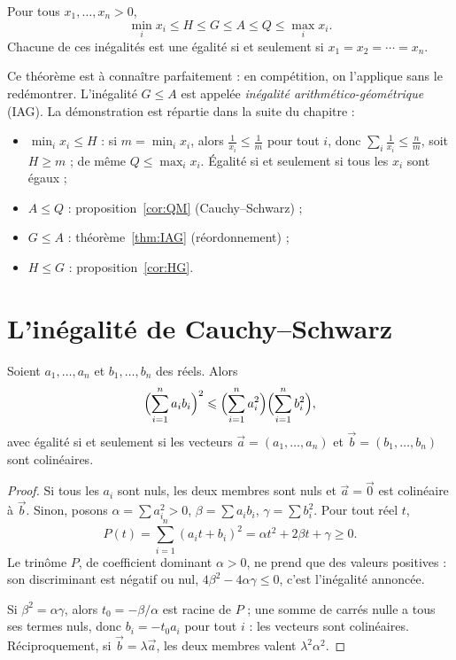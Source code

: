 \documentclass[11pt]{article}
\begin{document}
\begin{theoreme}\label{thm:moyn}
Pour tous $x_1, \ldots, x_n > 0$,
\[
\min_i x_i \leqslant H \leqslant G \leqslant A \leqslant Q \leqslant \max_i x_i .
\]
Chacune de ces inégalités est une égalité si et seulement si
$x_1 = x_2 = \cdots = x_n$.
\end{theoreme}

Ce théorème est à connaître parfaitement : en compétition, on l'applique
sans le redémontrer. L'inégalité $G \leqslant A$ est appelée
\emph{inégalité arithmético-géométrique} (IAG). La démonstration est
répartie dans la suite du chapitre :
\begin{itemize}
  \item $\min_i x_i \leqslant H$ : si $m = \min_i x_i$, alors
  $\frac{1}{x_i} \leqslant \frac1m$ pour tout $i$, donc
  $\sum_i \frac1{x_i} \leqslant \frac nm$, soit $H \geqslant m$ ; de même
  $Q \leqslant \max_i x_i$. Égalité si et seulement si tous les $x_i$ sont égaux ;
  \item $A \leqslant Q$ : proposition~\ref{cor:QM} (Cauchy--Schwarz) ;
  \item $G \leqslant A$ : théorème~\ref{thm:IAG} (réordonnement) ;
  \item $H \leqslant G$ : proposition~\ref{cor:HG}.
\end{itemize}

\section{L'inégalité de Cauchy--Schwarz}\label{sec:cauchy-schwarz}

\begin{theoreme}\label{thm:CS}
Soient $a_1, \ldots, a_n$ et $b_1, \ldots, b_n$ des réels. Alors
\[
\Bigl(\sum_{i=1}^{n} a_i b_i\Bigr)^2 \leqslant \Bigl(\sum_{i=1}^{n} a_i^2\Bigr)\Bigl(\sum_{i=1}^{n} b_i^2\Bigr),
\]
avec égalité si et seulement si les vecteurs $\vec a = (a_1, \ldots, a_n)$
et $\vec b = (b_1, \ldots, b_n)$ sont colinéaires.
\end{theoreme}

\begin{proof}
Si tous les $a_i$ sont nuls, les deux membres sont nuls et $\vec a = \vec 0$
est colinéaire à $\vec b$. Sinon, posons $\alpha = \sum a_i^2 > 0$,
$\beta = \sum a_i b_i$, $\gamma = \sum b_i^2$. Pour tout réel $t$,
\[
P(t) = \sum_{i=1}^{n} (a_i t + b_i)^2 = \alpha t^2 + 2\beta t + \gamma \geqslant 0 .
\]
Le trinôme $P$, de coefficient dominant $\alpha > 0$, ne prend que des
valeurs positives : son discriminant est négatif ou nul,
$4\beta^2 - 4\alpha\gamma \leqslant 0$, c'est l'inégalité annoncée.

Si $\beta^2 = \alpha\gamma$, alors $t_0 = -\beta/\alpha$ est racine de $P$ ;
une somme de carrés nulle a tous ses termes nuls, donc $b_i = -t_0 a_i$ pour
tout $i$ : les vecteurs sont colinéaires. Réciproquement, si
$\vec b = \lambda \vec a$, les deux membres valent $\lambda^2 \alpha^2$.
\end{proof}
\end{document}
